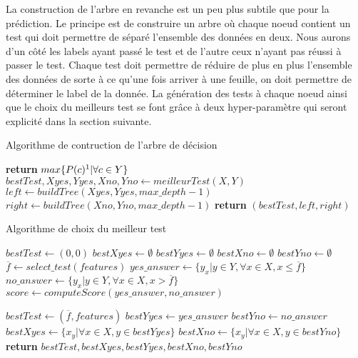 \documentclass[french, 14pt]{memoir}
\begin{document}
La construction de l'arbre en revanche est un peu plus subtile que pour la prédiction. Le principe est de construire un arbre où chaque noeud contient un test qui doit permettre de séparé l'ensemble des données en deux. Nous aurons d'un côté les labels ayant passé le test et de l'autre ceux n'ayant pas réussi à passer le test. Chaque test doit permettre de réduire de plus en plus l'ensemble des données de sorte à ce qu'une fois arriver à une feuille, on doit permettre de déterminer le label de la donnée. La génération des tests à chaque noeud ainsi que le choix du meilleurs test se font grâce à deux hyper-paramètre qui seront explicité dans la section suivante. 

\begin{algorithm}
\begin{minipage}[t]{20cm}
\caption{Algorithme de contruction de l'arbre de décision}
\label{buildTree}
\begin{algorithmic}[1]
\State \textbf{return} $max\{P(c)\footnote{où P(c) est la probabilité d'apparition de la classe c dans Y}|\forall c \in Y\}$
\Else
\State $bestTest, Xyes, Yyes, Xno, Yno \gets meilleurTest(X, Y)$
\State $left \gets buildTree(Xyes, Yyes, max\_depth - 1)$
\State $right \gets buildTree(Xno, Yno, max\_depth - 1)$
\State \textbf{return} $(bestTest, left, right)$
\EndIf
\EndFunction
\end{algorithmic}
\end{minipage}
\end{algorithm}

\begin{algorithm}
\begin{minipage}[t]{20cm}
\caption{Algorithme de choix du meilleur test}
\label{getBestTest}
\begin{algorithmic}[1]
\State $bestTest \gets (0,0)$
\State $bestXyes \gets \emptyset$
\State $bestYyes \gets \emptyset$
\State $bestXno \gets \emptyset$
\State $bestYno \gets \emptyset$
\State $\overline{f} \gets select\_test(features)$
\State $yes\_answer \gets \{y_x |y \in Y, \forall x \in X, x \leq \overline{f} \}$
\State $no\_answer \gets \{y_x |y \in Y, \forall x \in X, x > \overline{f} \}$
\State $score \gets computeScore(yes\_answer, no\_answer)$

\State $bestTest \gets (\overline{f}, features)$
\State $bestYyes \gets yes\_answer$
\State $bestYno \gets no\_answer$
 \State $bestXyes \gets \{x_y |\forall x \in X, y \in bestYyes\}$
 \State $bestXno \gets \{x_y |\forall x \in X, y \in bestYno\}$
\EndIf
\EndFor
\State \textbf{return} $bestTest, bestXyes, bestYyes, bestXno, bestYno$
\EndFunction
\end{algorithmic}
\end{minipage}
\end{algorithm}
\end{document}
